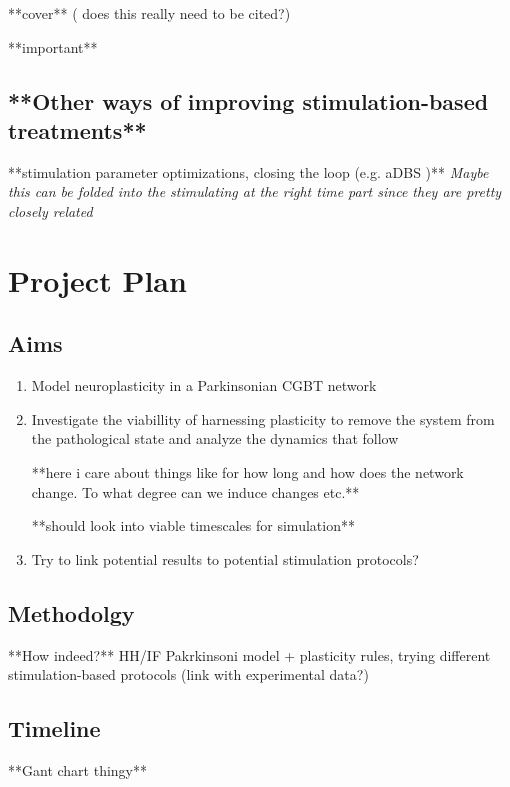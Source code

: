 **cover** \cite{jansen1995electroencephalogram} (\cite{hodgkin1952measurement} does this really need to be cited?)

**important** \cite{duchet2023mean} \cite{shupe2021integrate} \cite{schwab2020spike}

\subsection{**Other ways of improving stimulation-based treatments**}
**stimulation parameter optimizations, closing the loop (e.g. aDBS \cite{beudel2018adaptive})**
\textit{
	Maybe this can be folded into the stimulating at the right time part
	since they are pretty closely related
}

\section{Project Plan}


\subsection{Aims}
\begin{enumerate}
	\item Model neuroplasticity in a Parkinsonian CGBT network
	\item Investigate the viabillity of harnessing plasticity to remove the
	      system from the pathological state and analyze the dynamics that follow

	      **here i care about things like for how long and how does the network change.
	      To what degree can we induce changes etc.**

        **should look into viable timescales for simulation**
	\item Try to link potential results to potential stimulation protocols?
\end{enumerate}

\subsection{Methodolgy} **How indeed?** HH/IF Pakrkinsoni model + plasticity rules, trying
different stimulation-based protocols (link with experimental data?)

\subsection{Timeline}
**Gant chart thingy**


